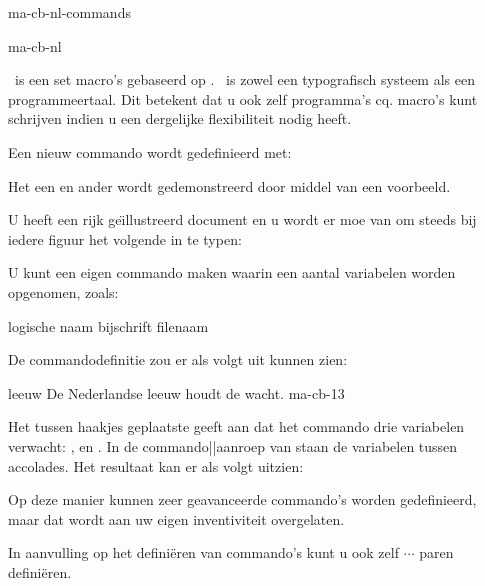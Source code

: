 \startonderdeel ma-cb-nl-commands

\produkt ma-cb-nl


\CONTEXT\ is een set macro's gebaseerd op \TEX. \TEX\ is
zowel een typografisch systeem als een programmeertaal. Dit
betekent dat u ook zelf programma's cq. macro's kunt
schrijven indien u een dergelijke flexibiliteit nodig heeft.

Een nieuw commando wordt gedefinieerd met:


Het een en ander wordt gedemonstreerd door middel van
een voorbeeld.

U heeft een rijk ge\"{\i}llustreerd document en u wordt er moe van
om steeds bij iedere figuur het volgende in te typen:

\startbuffer
{}
  {\externfiguur[filenaam][breedte=5cm]}
\stopbuffer

\typebuffer

U kunt een eigen commando maken waarin een aantal variabelen
worden opgenomen, zoals:

\startopsomming[opelkaar]
\som logische naam
\som bijschrift
\som filenaam
\stopopsomming

De commandodefinitie zou er als volgt uit kunnen zien:

\startbuffer
{}\plaatsmijnfiguur%
  {
     {\externfiguur[#3][breedte=5cm]}}

\plaatsmijnfiguur
   {leeuw}
   {De Nederlandse leeuw houdt de wacht.}
   {ma-cb-13}
\stopbuffer

\typebuffer

Het tussen haakjes geplaatste \type{[3]} geeft aan dat het
commando drie variabelen verwacht: ,  en
. In de commando||aanroep van
\type{\plaatsmijnfiguur} staan de variabelen tussen
accolades. Het resultaat kan er als volgt uitzien:

\haalbuffer

Op deze manier kunnen zeer geavanceerde commando's worden
gedefinieerd, maar dat wordt aan uw eigen inventiviteit
overgelaten.

In aanvulling op het defini\"eren van commando's kunt u ook
zelf \type{\start} $\cdots$ \type{\stop} paren defini\"eren.


